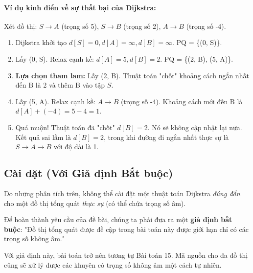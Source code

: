 \documentclass[a4paper,12pt]{article}
\begin{document}
\paragraph{Ví dụ kinh điển về sự thất bại của Dijkstra:}
Xét đồ thị: $S \to A$ (trọng số 5), $S \to B$ (trọng số 2), $A \to B$ (trọng số -4).
\begin{enumerate}
    \item Dijkstra khởi tạo $d[S]=0, d[A]=\infty, d[B]=\infty$. PQ = \{(0, S)\}.
    \item Lấy (0, S). Relax cạnh kề: $d[A]=5, d[B]=2$. PQ = \{(2, B), (5, A)\}.
    \item \textbf{Lựa chọn tham lam:} Lấy (2, B). Thuật toán "chốt" khoảng cách ngắn nhất đến B là 2 và thêm B vào tập $S$.
    \item Lấy (5, A). Relax cạnh kề: $A \to B$ (trọng số -4). Khoảng cách mới đến B là $d[A] + (-4) = 5 - 4 = 1$.
    \item Quá muộn! Thuật toán đã "chốt" $d[B]=2$. Nó sẽ không cập nhật lại nữa. Kết quả sai lầm là $d[B]=2$, trong khi đường đi ngắn nhất thực sự là $S \to A \to B$ với độ dài là 1.
\end{enumerate}

\subsection{Cài đặt (Với Giả định Bắt buộc)}
Do những phân tích trên, không thể cài đặt một thuật toán Dijkstra \textit{đúng đắn} cho một đồ thị tổng quát \textit{thực sự} (có thể chứa trọng số âm).

Để hoàn thành yêu cầu của đề bài, chúng ta phải đưa ra một \textbf{giả định bắt buộc}: "Đồ thị tổng quát được đề cập trong bài toán này được giới hạn chỉ có các trọng số không âm."

Với giả định này, bài toán trở nên tương tự Bài toán 15. Mã nguồn cho đa đồ thị cũng sẽ xử lý được các khuyên có trọng số không âm một cách tự nhiên.
\end{document}
